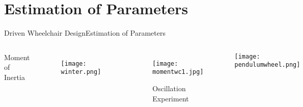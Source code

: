 \documentclass[10pt]{beamer}
\begin{document}
\section{Estimation of Parameters} 
\begin{frame}{Driven Wheelchair Design}{Estimation of Parameters}
\begin{columns}
\begin{minipage}[c][0.3\textheight][c]{\linewidth}
  \centering
	Moment of Inertia
  \end{minipage}
\begin{minipage}[c][0.4\textheight][c]{\linewidth}
  \begin{figure}
  \texttt{[image: winter.png]}
  \end{figure}
\end{minipage}
\begin{minipage}[c][0.45\textheight][c]{\linewidth}
  \begin{figure}
  \centering
  \texttt{[image: momentwc1.jpg]}
  \caption{Oscillation Experiment}
  \end{figure}
\end{minipage}
\begin{minipage}[c][0.4\textheight][c]{\linewidth}
  \centering
  \texttt{[image: pendulumwheel.png]}
\end{minipage}
\end{columns}
\end{frame}
\end{document}
